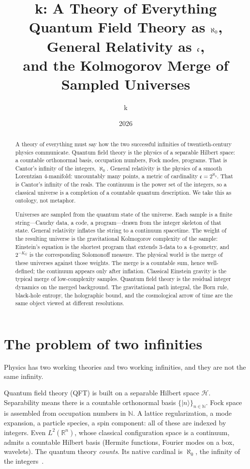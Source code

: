 \documentclass[11pt,a4paper]{article}
\title{\textbf{k}: A Theory of Everything\\[0.4em]
\large Quantum Field Theory as $\alef$, General Relativity as $\cont$,\\
and the Kolmogorov Merge of Sampled Universes}
\author{k}
\date{2026}
\theoremstyle{plain}
\theoremstyle{definition}
\theoremstyle{remark}
\newcommand{\N}{\mathbb{N}}
\newcommand{\R}{\mathbb{R}}
\newcommand{\alef}{\aleph_{0}}
\newcommand{\cont}{\mathfrak{c}}
\newcommand{\Hil}{\mathcal{H}}
\newcommand{\KG}{K_{G}}
\newcommand{\ket}[1]{\lvert#1\rangle}
\begin{document}
\maketitle

\begin{abstract}
A theory of everything must say how the two successful infinities of twentieth-century physics communicate.
Quantum field theory is the physics of a separable Hilbert space: a countable orthonormal basis, occupation numbers, Fock modes, programs.
That is Cantor's infinity of the integers, $\alef$.
General relativity is the physics of a smooth Lorentzian $4$-manifold: uncountably many points, a metric of cardinality $\cont = 2^{\alef}$.
That is Cantor's infinity of the reals.
The continuum is the power set of the integers, so a classical universe is a completion of a countable quantum description.
We take this as ontology, not metaphor.

Universes are sampled from the quantum state of the universe.
Each sample is a finite string---Cauchy data, a code, a program---drawn from the integer skeleton of that state.
General relativity inflates the string to a continuum spacetime.
The weight of the resulting universe is the gravitational Kolmogorov complexity of the sample: Einstein's equation is the shortest program that extends $3$-data to a $4$-geometry, and $2^{-\KG}$ is the corresponding Solomonoff measure.
The physical world is the merge of these universes against those weights.
The merge is a countable sum, hence well-defined; the continuum appears only after inflation.
Classical Einstein gravity is the typical merge of low-complexity samples.
Quantum field theory is the residual integer dynamics on the merged background.
The gravitational path integral, the Born rule, black-hole entropy, the holographic bound, and the cosmological arrow of time are the same object viewed at different resolutions.
\end{abstract}

\tableofcontents
\newpage

\section{The problem of two infinities}

Physics has two working theories and two working infinities, and they are not the same infinity.

Quantum field theory (QFT) is built on a separable Hilbert space $\Hil$.
Separability means there is a countable orthonormal basis $\{\ket{n}\}_{n\in\N}$.
Fock space is assembled from occupation numbers in $\N$.
A lattice regularization, a mode expansion, a particle species, a spin component: all of these are indexed by integers.
Even $L^{2}(\R^{n})$, whose classical configuration space is a continuum, admits a countable Hilbert basis (Hermite functions, Fourier modes on a box, wavelets).
The quantum theory \emph{counts}.
Its native cardinal is $\alef$, the infinity of the integers~\cite{cantor1891,halmos1974}.
\end{document}
